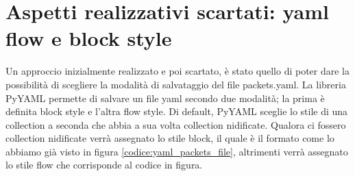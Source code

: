 \documentclass[binding=0.6cm]{sapthesis}
\begin{document}
 \section{Aspetti realizzativi scartati: yaml flow e block style}
 Un approccio inizialmente realizzato e poi scartato, è stato quello di poter dare la possibilità di scegliere la modalità di salvataggio del file packets.yaml.
La libreria PyYAML permette di salvare un file yaml secondo due modalità; la prima è definita block style e l'altra flow style.
Di default, PyYAML sceglie lo stile di una collection a seconda che abbia a sua volta collection nidificate. Qualora ci fossero collection nidificate
verrà assegnato lo stile block, il quale è il formato come lo abbiamo già visto in figura \ref{codice:yaml_packets_file}, altrimenti verrà assegnato
lo stile flow che corrisponde al codice in figura.
\end{document}
